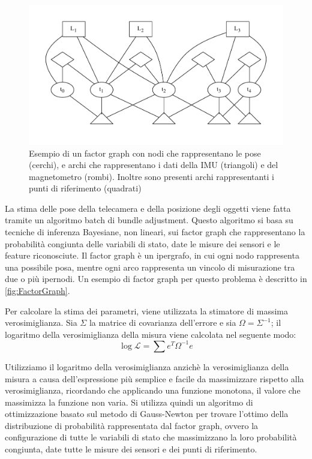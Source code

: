 \begin{figure}[ht]
  \includegraphics[width=\textwidth]{diagrammi/FactorGraph}
  \caption[Esempio di Factor Graph]{Esempio di un factor graph con nodi che rappresentano le pose (cerchi), e archi che rappresentano i dati della IMU (triangoli) e del magnetometro (rombi). Inoltre sono presenti archi rappresentanti i punti di riferimento (quadrati) }
  \label{fig:FactorGraph}
\end{figure}

La stima delle pose della telecamera e della posizione degli oggetti viene fatta tramite un algoritmo batch di bundle adjustment.
Questo algoritmo si basa su tecniche di inferenza Bayesiane, non lineari, sui factor graph che rappresentano la probabilità congiunta delle variabili di stato, date le misure dei sensori e le feature riconosciute.
Il factor graph è un ipergrafo, in cui ogni nodo rappresenta una possibile posa, mentre ogni arco rappresenta un vincolo di misurazione tra due o più ipernodi. Un esempio di factor graph per questo problema è descritto in \autoref{fig:FactorGraph}.

Per calcolare la stima dei parametri, viene utilizzata la stimatore di massima verosimiglianza. Sia $\Sigma$ la matrice di covarianza dell'errore e sia $\Omega = \Sigma^{-1}$; il logaritmo della verosimiglianza della misura viene calcolata nel seguente modo:
\begin{equation*}
 \log\mathcal{L}=\sum e^{T}\Omega^{-1}e
\end{equation*}

Utilizziamo il logaritmo della verosimiglianza anzichè la verosimiglianza della misura a causa dell'espressione più semplice e facile da massimizzare rispetto alla verosimiglianza, ricordando che applicando una funzione monotona, il valore che massimizza la funzione non varia.
Si utilizza quindi un algoritmo di ottimizzazione basato sul metodo di Gauss-Newton per trovare l'ottimo della distribuzione di probabilità rappresentata dal factor graph, ovvero la configurazione di tutte le variabili di stato che massimizzano la loro probabilità congiunta, date tutte le misure dei sensori e dei punti di riferimento.

